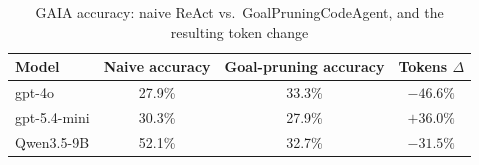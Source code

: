 \documentclass{article}
\begin{document}
\begin{table}[h]
\centering
\caption{GAIA accuracy: naive ReAct vs.\ GoalPruningCodeAgent, and the resulting token change}
\label{tab:goal-pruning-vs-naive}
\begin{tabular}{lccc}
\toprule
Model & Naive accuracy & Goal-pruning accuracy & Tokens $\Delta$ \\
\midrule
gpt-4o        & 27.9\% & 33.3\% & $-46.6\%$ \\
gpt-5.4-mini  & 30.3\% & 27.9\% & $+36.0\%$ \\
Qwen3.5-9B    & 52.1\% & 32.7\% & $-31.5\%$ \\
\bottomrule
\end{tabular}
\end{table}
\end{document}
